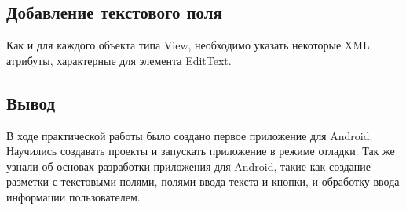 \subsection{Добавление текстового поля}
Как и для каждого объекта типа View, необходимо указать некоторые XML атрибуты, характерные для элемента EditText.

\newpage

\subsection*{Вывод}
В ходе практической работы было создано первое приложение для Android.
Научились создавать проекты и запускать приложение в режиме отладки.
Так же узнали об основах разработки приложения для Android, такие как
создание разметки с текстовыми полями, полями ввода текста и кнопки,
и обработку ввода информации пользователем.
